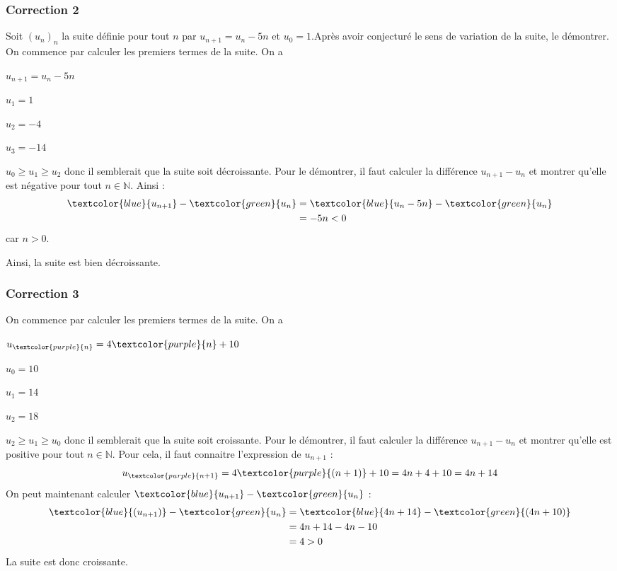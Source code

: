 \documentclass[15pt, mathserif]{beamer}
\newcommand{\N}{\mathbb{N}}			%
\begin{document}
\begin{frame}
\vspace{-10mm}
	\frametitle{Correction 2}
\bigskip 
 Soit $(u_n)_n$ la suite définie pour tout $n$ par $u_{n+1}=u_n-5n$ et $u_0=1$.Après avoir conjecturé le sens de variation de la suite, le démontrer. On commence par calculer les premiers termes de la suite. On a 
 \begin{multicols}{4} 
 $u_{n+1}=u_n-5n$ 
 
  \columnbreak 
 
 $u_1=1$ 
 
 \columnbreak 
 
 $u_2=-4$ 
 
 \columnbreak 
 
 $u_3=-14$ 
  \end{multicols} $u_0 \geqslant u_1 \geqslant u_2$ donc il semblerait que la suite soit décroissante. Pour le démontrer, il faut calculer la différence $u_{n+1} -u_n$ et montrer qu'elle est négative pour tout $n \in \N$. Ainsi : \begin{align*} \textcolor{blue}{u_{n+1}}-\textcolor{green}{u_n} &=\textcolor{blue}{u_n-5n}-\textcolor{green}{u_n} \\ 
 &=-5n <0 
 \end{align*} car $n>0$. 
 
 Ainsi, la suite est bien décroissante. \end{frame}


\begin{frame}
\vspace{-10mm}
	\frametitle{Correction 3}
 \vspace*{1cm} 
 On commence par calculer les premiers termes de la suite. On a 
 \begin{multicols}{4} 
 $u_{\textcolor{purple}{n}}=4\textcolor{purple}{n}+10$ 
 
  \columnbreak 
 
  $u_0=10$ 
 
  \columnbreak 
 
 $u_1=14$ 
 
 \columnbreak 
 
 $u_2=18$ 
  \end{multicols} $u_2 \geqslant u_1 \geqslant u_0$ donc il semblerait que la suite soit croissante. Pour le démontrer, il faut calculer la différence $u_{n+1} -u_n$ et montrer qu'elle est positive pour tout $n \in \N$. Pour cela, il faut connaitre l'expression de $u_{n+1}$ : $$u_{\textcolor{purple}{n+1}} = 4\textcolor{purple}{(n+1)}+10=4n+4+10=4n+14$$ On peut maintenant calculer $\textcolor{blue}{u_{n+1}}-\textcolor{green}{u_n} $ : \begin{align*} \textcolor{blue}{(u_{n+1})}-\textcolor{green}{u_n} &=\textcolor{blue}{4n+14}-\textcolor{green}{(4n+10)} \\ 
 &= 4n+14-4n-10\\ 
 &= 4 >0 
 \end{align*} 
 La suite est donc croissante. \end{frame}
\end{document}

